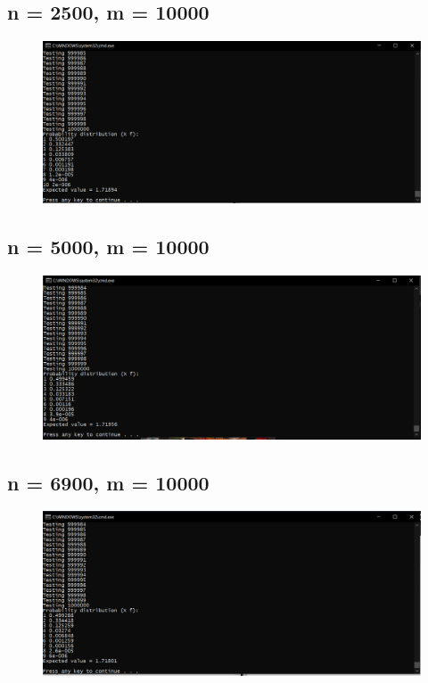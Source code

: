 \documentclass[12pt]{article}
\begin{document}
\subsection{n = 2500, m = 10000}
\begin{figure}[H]
\centering
\includegraphics[scale=0.5]{2500-10k-1000k.PNG}
\end{figure}
\subsection{n = 5000, m = 10000}
\begin{figure}[H]
\centering
\includegraphics[scale=0.5]{5000-10k-1000k.PNG}
\end{figure}
\subsection{n = 6900, m = 10000}
\begin{figure}[H]
\centering
\includegraphics[scale=0.5]{6900-10k-1000k.PNG}
\end{figure}
\end{document}
